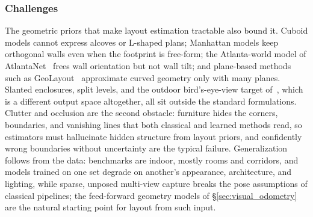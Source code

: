 \subsubsection{Challenges}
The geometric priors that make layout estimation tractable also bound it. Cuboid models cannot express alcoves or L-shaped plans; Manhattan models keep orthogonal walls even when the footprint is free-form; the Atlanta-world model of AtlantaNet~\cite{pintore2020atlantanet} frees wall orientation but not wall tilt; and plane-based methods such as GeoLayout~\cite{0005ZZ20} approximate curved geometry only with many planes. Slanted enclosures, split levels, and the outdoor bird's-eye-view target of~\cite{YangLLYMHP21}, which is a different output space altogether, all sit outside the standard formulations.
Clutter and occlusion are the second obstacle: furniture hides the corners, boundaries, and vanishing lines that both classical and learned methods read, so estimators must hallucinate hidden structure from layout priors, and confidently wrong boundaries without uncertainty are the typical failure.
Generalization follows from the data: benchmarks are indoor, mostly rooms and corridors, and models trained on one set degrade on another's appearance, architecture, and lighting, while sparse, unposed multi-view capture breaks the pose assumptions of classical pipelines; the feed-forward geometry models of \S\ref{sec:visual_odometry} are the natural starting point for layout from such input.

